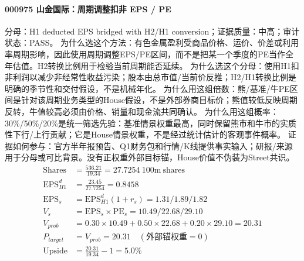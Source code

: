 \paragraph{000975 山金国际：周期调整扣非 EPS / PE}
分母：H1 deducted EPS bridged with H2/H1 conversion；证据质量：中高；审计状态：PASS。
为什么选这个方法：有色金属盈利受商品价格、运价、价差或利用率周期影响，因此使用周期调整EPS/PE区间，而不是把某一个季度的PE当作全年估值。H2转换比例用于检验当前周期能否延续。
为什么选这个分母：使用H1扣非利润以减少非经常性收益污染；股本由总市值/当前价反推；H2/H1转换比例是明确的季节性和交付假设，不是机械年化。
为什么用这组倍数：熊/基准/牛PE区间是针对该周期业务类型的House假设，不是外部券商目标价；熊值较低反映周期反转，牛值较高必须由价格、销量和现金流共同确认。
为什么用这组概率：30\%/50\%/20\%是统一筛选先验：基准情景权重最高，同时保留熊市和牛市的实质性下行/上行贡献；它是House情景权重，不是经过统计估计的客观事件概率。
证据如何参与：官方半年报预告、Q1财务包和行情/K线提供事实输入；研报/来源用于分母或可比背景。没有正权重外部目标锚，House价值不伪装为Street共识。
\begin{align*}
\mathrm{Shares} &= \frac{536.21}{19.34}=27.7254\ \mathrm{100m\ shares}\\
\mathrm{EPS}_{H1}^d &= \frac{23.45}{27.7254}=0.8458\\
\mathrm{EPS}_s &= \mathrm{EPS}_{H1}^d(1+r_s)=1.31/1.89/1.82\\
V_s &= \mathrm{EPS}_s\times \mathrm{PE}_s=10.49/22.68/29.10\\
V_{prob} &= 0.30\times 10.49+0.50\times 22.68+0.20\times 29.10=20.31\\
P_{target} &= V_{prob}=20.31\quad(\text{外部锚权重}=0)\\
\mathrm{Upside} &= \frac{20.31}{19.34}-1=5.0\%\\
\end{align*}

